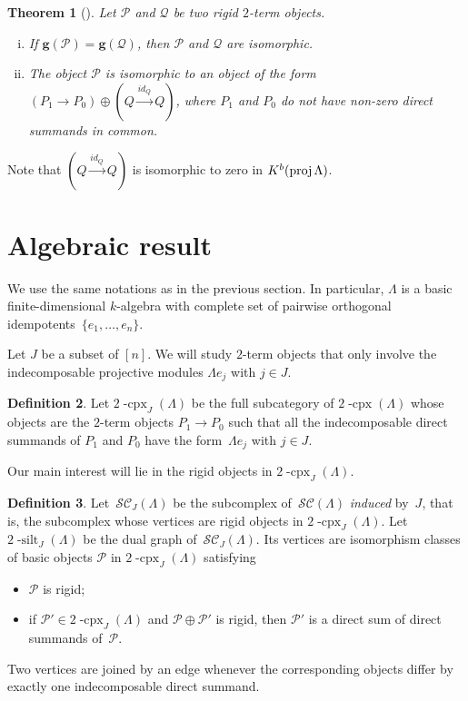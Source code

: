 \documentclass{compositio}
\newtheorem{theorem}{Theorem}%
\theoremstyle{definition}
\newtheorem{definition}[theorem]{Definition}
\renewcommand{\b}[1]{\mathbf{#1}} %
\newcommand{\darkblue}{\color{darkblue}} %
\newcommand{\defn}[1]{\textsl{\darkblue #1}} %
\newcommand{\complexP}{\mathcal{P}} %
\newcommand{\complexQ}{\mathcal{Q}} %
\newcommand{\cpx}{2 \! \operatorname{-cpx}}
\newcommand{\silt}{2 \! \operatorname{-silt}}
\newcommand{\siltingComplex}{\mathcal{SC}}
\newcommand{\proj}{\operatorname{{\rm proj }}}
\begin{document}
\begin{theorem}[{\cite[Sec.~2.3 \& 2.4]{DehyKeller}}]
Let $\complexP$ and $\complexQ$ be two rigid $2$-term objects. 
\begin{enumerate}[(i)]
  \item If ${\b{g}(\complexP) = \b{g}(\complexQ)}$, then $\complexP$ and $\complexQ$ are isomorphic.
  
  \item The object $\complexP$ is isomorphic to an object of the form $(P_1\to P_0) \oplus (Q\stackrel{id_Q}{\to} Q)$,
    where $P_1$ and $P_0$ do not have non-zero direct summands in common.
 \end{enumerate}
\end{theorem}
Note that $(Q\stackrel{id_Q}{\to} Q)$ is isomorphic to zero in $K^b(\proj \Lambda)$.


\section{Algebraic result}

We use the same notations as in the previous section.  In particular, $\Lambda$ is a basic finite-dimensional $k$-algebra
with complete set of pairwise orthogonal idempotents~$\{e_1, \dots, e_n\}$.

Let $J$ be a subset of $[n]$.  
We will study $2$-term objects that only involve the indecomposable projective modules $\Lambda e_j$ with $j\in J$.

\begin{definition}
Let $\cpx_J(\Lambda)$ be the full subcategory of $\cpx(\Lambda)$ whose objects are the $2$-term objects $P_1\to P_0$ such that all the indecomposable direct summands of $P_1$ and $P_0$ have the form~$\Lambda e_j$ with $j\in J$.
\end{definition}

Our main interest will lie in the rigid objects in $\cpx_J(\Lambda)$.

\begin{definition}
Let~$\siltingComplex_J(\Lambda)$ be the subcomplex of~$\siltingComplex(\Lambda)$ \defn{induced} by~$J$, that is, the subcomplex whose vertices are rigid objects in $\cpx_J(\Lambda)$.
Let $\silt_J(\Lambda)$ be the dual graph of~$\siltingComplex_J(\Lambda)$.
Its vertices are isomorphism classes of basic objects $\complexP$ in $\cpx_J(\Lambda)$ satisfying
\begin{itemize}
\item $\complexP$ is rigid;
\item if $\complexP'\in \cpx_J(\Lambda)$ and $\complexP\oplus \complexP'$ is rigid, then $\complexP'$ is a direct sum of direct summands of~$\complexP$.
\end{itemize}
Two vertices are joined by an edge whenever the corresponding objects differ by exactly one indecomposable direct summand.
\end{definition}
\end{document}
